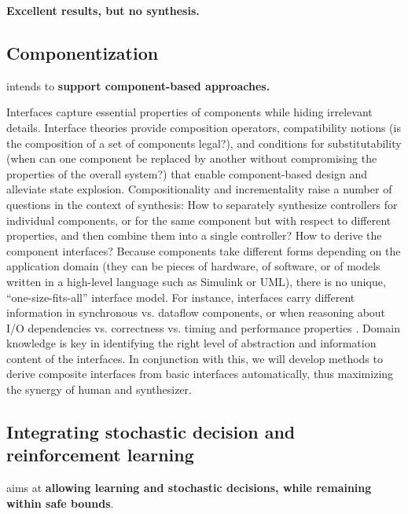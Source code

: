 \textbf{Excellent results, but no synthesis.}

\subsection{Componentization}
\project intends to \textbf{support component-based approaches.} 


Interfaces capture essential properties of components while hiding
irrelevant details. Interface theories \cite{AlfaroH01} provide
composition operators, compatibility notions (is the composition of a
set of components legal?), and conditions for substitutability (when
can one component be replaced by another without compromising the
properties of the overall system?) that enable component-based design
and alleviate state explosion. Compositionality and incrementality
raise a number of questions in the context of synthesis: How to
separately synthesize controllers for individual components, or for
the same component but with respect to different properties, and then
combine them into a single controller? How to derive the component
interfaces? Because components take different forms depending on the
application domain (they can be pieces of hardware, of software, or of
models written in a high-level language such as Simulink or UML),
there is no unique, “one-size-fits-all” interface model. For instance,
interfaces carry different information in synchronous vs. dataflow
components, or when reasoning about I/O dependencies vs. correctness
vs. timing and performance properties \cite{LublinermanT08,LublinermanST09,TripakisLHL11}. Domain knowledge is key in
identifying the right level of abstraction and information content of
the interfaces. In conjunction with this, we will develop methods to
derive composite interfaces from basic interfaces automatically, thus
maximizing the synergy of human and synthesizer.

\subsection{Integrating stochastic decision and reinforcement learning} 

\project aims at \textbf{allowing learning and stochastic decisions, while remaining within safe bounds}.


